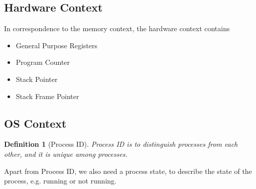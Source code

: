 \documentclass[11pt]{article}
\newtheorem{definition}{Definition}[section]
\theoremstyle{definition}
\begin{document}
\subsection{Hardware Context}
In correspondence to the memory context, the hardware context contains
\begin{itemize}[itemsep=0pt]
  \item General Purpose Registers
  \item Program Counter
  \item Stack Pointer
  \item Stack Frame Pointer
\end{itemize}
\subsection{OS Context}
\begin{definition}[Process ID]
\normalfont Process ID is to distinguish processes from each other, and it is unique among processes.
\end{definition}
Apart from Process ID, we also need a process state, to describe the state of the process, e.g. running or not running.
\end{document}
